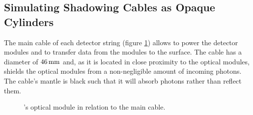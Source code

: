 \subsection{Simulating Shadowing Cables as Opaque Cylinders}
\label{sec:cables}

The main cable of each detector string (figure \ref{fig:ahyoi7Ma})
allows to power the detector modules and to transfer data from the
modules to the surface. The cable has a diameter of \(46\text{\,mm}\)
\cite{instrumentation} and, as it is located in close proximity to the
optical modules, shields the optical modules from a non-negligible
amount of incoming photons. The cable's mantle is black such that it
will absorb photons rather than reflect them.

\begin{figure}[htbp]
  \hfill
  \hfill
  \caption{\icecube's optical module in relation to the main cable.}
  \label{fig:ahyoi7Ma}
\end{figure}

